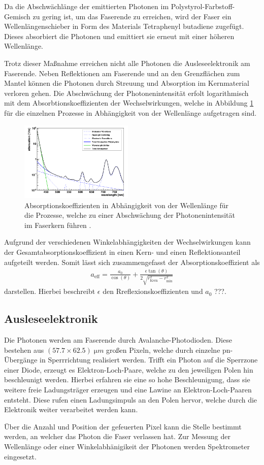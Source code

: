 Da die Abschwächlänge der emittierten Photonen im Polystyrol-Farbstoff-Gemisch zu gering ist, um das Faserende zu erreichen, wird der Faser ein Wellenlängenschieber in Form des Materials Tetraphenyl butadiene zugefügt. Dieses absorbiert die Photonen und emittiert sie erneut mit einer höheren Wellenlänge.

Trotz dieser Maßnahme erreichen nicht alle Photonen die Ausleseelektronik am Faserende. Neben Reflektionen am Faserende und an den Grenzflächen zum Mantel können die Photonen durch Streuung und Absorption im Kernmaterial verloren gehen. Die Abschwächung der Photonenintensität erfolt logarithmisch mit dem Absorbtionskoeffizienten der Wechselwirkungen, welche in Abbildung \ref{fig:ww} für die einzelnen Prozesse in Abhängigkeit von der Wellenlänge aufgetragen sind.\\
\begin{figure}
    \includegraphics[width=0.48\textwidth]{plots/Absorption.png}
    \caption{Absorptionskoeffizienten in Abhängigkeit von der Wellenlänge für die Prozesse, welche zu einer Abschwächung der Photonenintensität im Faserkern führen \cite{anleitung}.}
    \label{fig:ww}
  \end{figure}
  \FloatBarrier
Aufgrund der verschiedenen Winkelabhängigkeiten der Wechselwirkungen kann der Gesamtabsorptionskoeffizient in einen Kern- und einen Reflektionsanteil aufgeteilt werden. Somit lässt sich zusammengefasst der Absorptionskoeffizient als
\begin{align}
    a_{\mathrm{eff}} = \frac{a_0}{\cos(\theta)} + \frac{\epsilon \tan(\theta)}{2 \sqrt{r_{\mathrm{Kern}}^2 - r_{\mathrm{min}}^2}}
    \label{eq:9}
\end{align}
darstellen. Hierbei beschreibt $\epsilon$ den Rreflexionskoeffizienten und $a_0$ ???.

\subsection{Ausleseelektronik}
Die Photonen werden am Faserende durch Avalanche-Photodioden. Diese bestehen aus $(57.7 \times 62.5)\;\si{\micro m}$ großen Pixeln, welche durch einzelne pn-Übergänge in Sperrrichtung realisiert werden. Trifft ein Photon auf die Sperrzone einer Diode, erzeugt es Elektron-Loch-Paare, welche zu den jeweiligen Polen hin beschleunigt werden. Hierbei erfahren sie eine so hohe Beschleunigung, dass sie weitere freie Ladungsträger erzeugen und eine Lawine an Elektron-Loch-Paaren entsteht. Diese rufen einen Ladungsimpuls an den Polen hervor, welche durch die Elektronik weiter verarbeitet werden kann.

Über die Anzahl und Position der gefeuerten Pixel kann die Stelle bestimmt werden, an welcher das Photon die Faser verlassen hat. Zur Messung der Wellenlänge oder einer Winkelabhänigikeit der Photonen werden Spektrometer eingesetzt.
